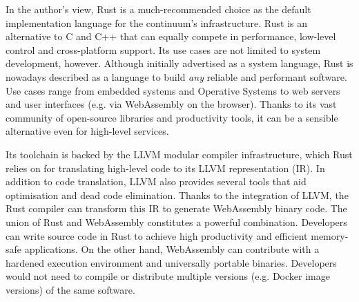 In the author's view, Rust is a much-recommended choice as the default implementation language for the continuum's infrastructure. Rust is an alternative to C and C++ that can equally compete in performance, low-level control and cross-platform support. Its use cases are not limited to system development, however. Although initially advertised as a system language, Rust is nowadays described as a language to build \emph{any} reliable and performant software. Use cases range from embedded systems and Operative Systems to web servers and user interfaces (e.g. via WebAssembly on the browser). Thanks to its vast community of open-source libraries and productivity tools, it can be a sensible alternative even for high-level services.

Its toolchain is backed by the LLVM modular compiler infrastructure, which Rust relies on for translating high-level code to its LLVM representation (IR). In addition to code translation, LLVM also provides several tools that aid optimisation and dead code elimination. Thanks to the integration of LLVM, the Rust compiler can transform this IR to generate WebAssembly binary code. The union of Rust and WebAssembly constitutes a powerful combination. Developers can write source code in Rust to achieve high productivity and efficient memory-safe applications. On the other hand, WebAssembly can contribute with a hardened execution environment and universally portable binaries. Developers would not need to compile or distribute multiple versions (e.g. Docker image versions) of the same software. 




